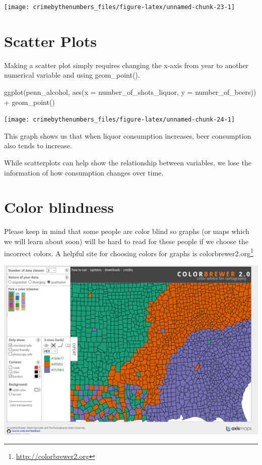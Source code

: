 \documentclass[
]{krantz}
\makeatletter
\newenvironment{Shaded}{\begin{snugshade}}{\end{snugshade}}
\newcommand{\AttributeTok}[1]{\textcolor[rgb]{0.61,0.61,0.61}{#1}}
\newcommand{\FunctionTok}[1]{\textcolor[rgb]{0,0,0}{#1}}
\newcommand{\NormalTok}[1]{#1}
\newcommand{\SpecialCharTok}[1]{\textcolor[rgb]{0,0,0}{#1}}
\renewcommand{\href}[2]{#2\footnote{\url{#1}}}
\newenvironment{kframe}{%
\medskip{}
\setlength{\fboxsep}{.8em}
 \def\at@end@of@kframe{}%
 \ifinner\ifhmode%
  \def\at@end@of@kframe{\end{minipage}}%
  \begin{minipage}{\columnwidth}%
 \fi\fi%
 \def\FrameCommand##1{\hskip\@totalleftmargin \hskip-\fboxsep
 \colorbox{shadecolor}{##1}\hskip-\fboxsep
     \hskip-\linewidth \hskip-\@totalleftmargin \hskip\columnwidth}%
 \MakeFramed {\advance\hsize-\width
   \@totalleftmargin\z@ \linewidth\hsize
   \@setminipage}}%
 {\par\unskip\endMakeFramed%
 \at@end@of@kframe}
\renewenvironment{Shaded}{\begin{kframe}}{\end{kframe}}
\makeatother
\begin{document}
\begin{center}\texttt{[image: crimebythenumbers\_files/figure-latex/unnamed-chunk-23-1]} \end{center}

\hypertarget{scatter-plots}{%
\section{Scatter Plots}\label{scatter-plots}}

Making a scatter plot simply requires changing the x-axis from year to another numerical variable and using geom\_point().

\begin{Shaded}
\begin{Highlighting}[]
\FunctionTok{ggplot}\NormalTok{(penn\_alcohol, }\FunctionTok{aes}\NormalTok{(}\AttributeTok{x =}\NormalTok{ number\_of\_shots\_liquor, }\AttributeTok{y =}\NormalTok{ number\_of\_beers)) }\SpecialCharTok{+}
  \FunctionTok{geom\_point}\NormalTok{()}
\end{Highlighting}
\end{Shaded}

\begin{center}\texttt{[image: crimebythenumbers\_files/figure-latex/unnamed-chunk-24-1]} \end{center}

This graph shows us that when liquor consumption increases, beer consumption also tends to increase.

While scatterplots can help show the relationship between variables, we lose the information of how consumption changes over time.

\hypertarget{color-blindness}{%
\section{Color blindness}\label{color-blindness}}

Please keep in mind that some people are color blind so graphs (or maps which we will learn about soon) will be hard to read for these people if we choose the incorrect colors. A helpful site for choosing colors for graphs is \href{http://colorbrewer2.org}{colorbrewer2.org}

\includegraphics{images/colorbrewer.PNG}
\end{document}
